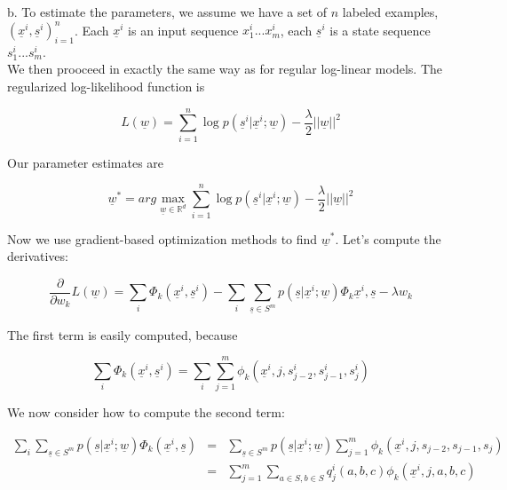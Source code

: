 \documentclass[12pt]{article}
\begin{document}
b. To estimate the parameters, we assume we have a set of $n$ labeled
examples, ${(\underline {x}^i, \underline {s}^i)}_{i=1}^n$. Each
$\underline{x}^i$ is an input sequence $x_1^i...x_m^i$, each
$\underline {s}^i$ is a state sequence $s_1^i...s_m^i$.\\

We then prooceed in exactly the same way as for regular log-linear
models. The regularized log-likelihood function is

\begin{equation*}
L(\underline {w}) = \sum_{i=1}^n {\log p(\underline {s}^i |
  \underline{x}^i; \underline {w})} - \frac {\lambda}{2} ||\underline
{w}||^2
\end{equation*}

Our parameter estimates are

\begin{equation*}
\underline {w}^* = arg \max_{\underline {w} \in \mathbb{R}^d}
\sum_{i=1}^n {\log p(\underline {s}^i | \underline{x}^i; \underline
  {w})} - \frac {\lambda}{2} ||\underline {w}||^2
\end{equation*}

Now we use gradient-based optimization methods to find
$\underline{w}^*$. Let's compute the derivatives:

\begin{equation*}
\frac {\partial} {\partial w_k} L(\underline {w}) = 
\sum_i {\Phi_k(\underline {x}^i, \underline {s}^i)}
- \sum_i {\sum_{\underline {s} \in S^m} {p(\underline {s} | \underline
    {x}^i; \underline {w}) \Phi_k {\underline {x}^i, \underline {s}}}}
- \lambda w_k
\end{equation*}

The first term is easily computed, because

\begin{equation*}
\sum_i {\Phi_k(\underline {x}^i, \underline {s}^i)} =
\sum_i {\sum_{j=1}^m {\phi_k (\underline {x}^i, j, s_{j-2}^i,
    s_{j-1}^i, s_j^i)}}
\end{equation*}

We now consider how to compute the second term:

\begin{eqnarray*}
\sum_i {\sum_{\underline {s} \in S^m} {p(\underline {s} | \underline
    {x}^i; \underline {w}) \Phi_k (\underline {x}^i, \underline {s})}}
&=& \sum_{\underline {s} \in S^m} {p(\underline {s} | \underline {x}^i;
  \underline {w})} \sum_{j=1}^m {\phi_k (\underline {x}^i, j, s_{j-2},
  s_{j-1}, s_j)} \\
&=& \sum_{j=1}^m {\sum_{a \in S, b \in S} {q_j^i(a,b,c) \phi_k
    (\underline {x}^i, j, a, b, c)}}
\end{eqnarray*}
\end{document}
